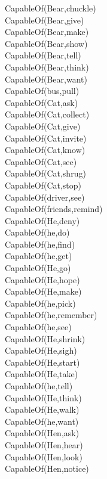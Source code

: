 \begin{multicols}{2}
\begin{footnotesize}
\noindent
CapableOf(Bear,chuckle) \\
CapableOf(Bear,give) \\
CapableOf(Bear,make) \\
CapableOf(Bear,show) \\
CapableOf(Bear,tell) \\
CapableOf(Bear,think) \\
CapableOf(Bear,want) \\
CapableOf(bus,pull) \\
CapableOf(Cat,ask) \\
CapableOf(Cat,collect) \\
CapableOf(Cat,give) \\
CapableOf(Cat,invite) \\
CapableOf(Cat,know) \\
CapableOf(Cat,see) \\
CapableOf(Cat,shrug) \\
CapableOf(Cat,stop) \\
CapableOf(driver,see) \\
CapableOf(friends,remind) \\
CapableOf(He,deny) \\
CapableOf(he,do) \\
CapableOf(he,find) \\
CapableOf(he,get) \\
CapableOf(He,go) \\
CapableOf(He,hope) \\
CapableOf(He,make) \\
CapableOf(he,pick) \\
CapableOf(he,remember) \\
CapableOf(he,see) \\
CapableOf(He,shrink) \\
CapableOf(He,sigh) \\
CapableOf(He,start) \\
CapableOf(He,take) \\
CapableOf(he,tell) \\
CapableOf(He,think) \\
CapableOf(He,walk) \\
CapableOf(he,want) \\
CapableOf(Hen,ask) \\
CapableOf(Hen,hear) \\
CapableOf(Hen,look) \\
CapableOf(Hen,notice) \\

\end{footnotesize}
\end{multicols}

